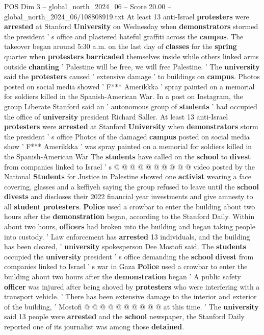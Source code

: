 \begin{textsample}{POS Dim 3 – global\_north\_2024\_06 – Score 20.00 – global\_north\_2024\_06/108808919.txt}  \label{ex:f3_pos_075}
At least 13 anti-Israel \textbf{protesters} were \textbf{arrested} at Stanford \textbf{University} on Wednesday when \textbf{demonstrators} stormed the president ' s office and plastered hateful graffiti across the \textbf{campus}.
The takeover began around 5:30 a.m. on the last day of \textbf{classes} for the \textbf{spring} quarter when \textbf{protesters} \textbf{barricaded} themselves inside while others linked arms outside \textbf{chanting} ' Palestine will be free, we will free Palestine. ' The \textbf{university} said the \textbf{protesters} caused ' extensive damage ' to buildings on \textbf{campus}.
Photos posted on social media showed ' F*** Amerikkka ' spray painted on a memorial for soldiers killed in the Spanish-American War.
In a post on Instagram, the group Liberate Stanford said an ' autonomous group of \textbf{students} ' had occupied the office of \textbf{university} president Richard Saller.
At least 13 anti-Israel \textbf{protesters} were \textbf{arrested} at Stanford \textbf{University} when \textbf{demonstrators} storm the president ' s office Photos of the damaged \textbf{campus} posted on social media show ' F*** Amerikkka ' was spray painted on a memorial for soldiers killed in the Spanish-American War The \textbf{students} have called on the \textbf{school} to \textbf{divest} from companies linked to Israel ' s @ @ @ @ @ @ @ @ @ @ video posted by the National \textbf{Students} for Justice in Palestine showed one \textbf{activist} wearing a face covering, glasses and a keffiyeh saying the group refused to leave until the \textbf{school} \textbf{divests} and discloses their 2022 financial year investments and give amnesty to all \textbf{student} \textbf{protesters}. \textbf{Police} used a crowbar to enter the building about two hours after the \textbf{demonstration} began, according to the Stanford Daily.
Within about two hours, \textbf{officers} had broken into the building and began taking people into custody. ' Law enforcement has \textbf{arrested} 13 individuals, and the building has been cleared, ' \textbf{university} spokesperson Dee Mostofi said.
The \textbf{students} occupied the \textbf{university} president ' s office demanding the \textbf{school} \textbf{divest} from companies linked to Israel ' s war in Gaza \textbf{Police} used a crowbar to enter the building about two hours after the \textbf{demonstration} began ' A public safety \textbf{officer} was injured after being shoved by \textbf{protesters} who were interfering with a transport vehicle. ' There has been extensive damage to the interior and exterior of the building, ' Mostofi @ @ @ @ @ @ @ @ @ @ at this time. ' The \textbf{university} said 13 people were \textbf{arrested} and the \textbf{school} newspaper, the Stanford Daily reported one of its journalist was among those \textbf{detained}.

\end{textsample}
